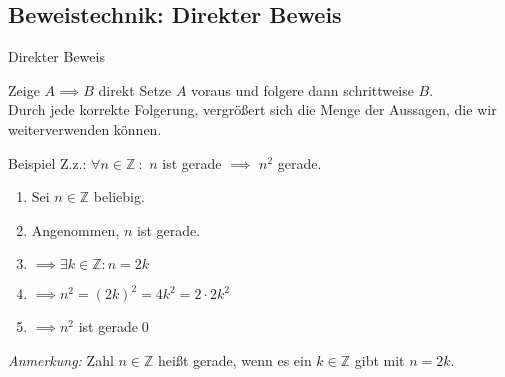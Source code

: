 %
%
%
%

\subsection{Beweistechnik: Direkter Beweis}
\begin{frame}[fragile]{Direkter Beweis}
	\begin{alertblock}{Zeige $A\implies B$ direkt}
		Setze $A$ voraus und folgere dann schrittweise $B$.\\
		Durch jede korrekte Folgerung, vergrößert sich die Menge der Aussagen, die wir weiterverwenden können.
	\end{alertblock}
	\begin{exampleblock}{Beispiel}
		Z.z.: \alert<2|handout:0>{$\forall n\in\mathbb{Z}$}$\ :$ \alert<3|handout:0>{$n$ ist gerade} $\implies$ \alert<6|handout:0>{$n^2$ gerade.}
		\begin{enumerate}
			\item \alert<2|handout:0>{Sei $n\in\mathbb{Z}$ beliebig.}
			\item \alert<3|handout:0>{Angenommen, $n$ ist gerade.}
			\item \alert<4|handout:0>{$\implies \exists k\in\mathbb{Z} : n = 2k$}
			\item \alert<5|handout:0>{$\implies n^2 = (2k)^2 = 4k^2 = 2 \cdot 2k^2$}
			\item \alert<6|handout:0>{$\implies n^2$ ist gerade}\qed\;
		\end{enumerate}
	\end{exampleblock}
	\small{\emph{\alert<4|handout:0>{Anmerkung:}} Zahl $n\in\mathbb{Z}$ heißt gerade, wenn es ein $k\in\mathbb{Z}$ gibt mit $n=2k$.}
\end{frame}

